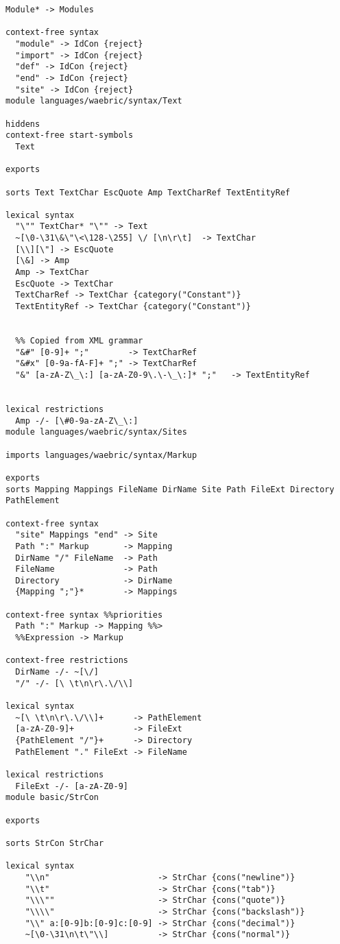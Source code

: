 \documentclass[a4paper]{article}
\begin{document}
\begin{lstlisting}[language=sdf]
  Module* -> Modules

context-free syntax
  "module" -> IdCon {reject}
  "import" -> IdCon {reject}
  "def" -> IdCon {reject}
  "end" -> IdCon {reject}
  "site" -> IdCon {reject}
module languages/waebric/syntax/Text

hiddens
context-free start-symbols
  Text

exports

sorts Text TextChar EscQuote Amp TextCharRef TextEntityRef

lexical syntax
  "\"" TextChar* "\"" -> Text 
  ~[\0-\31\&\"\<\128-\255] \/ [\n\r\t]  -> TextChar
  [\\][\"] -> EscQuote
  [\&] -> Amp
  Amp -> TextChar
  EscQuote -> TextChar
  TextCharRef -> TextChar {category("Constant")}
  TextEntityRef -> TextChar {category("Constant")}
 

  %% Copied from XML grammar
  "&#" [0-9]+ ";"        -> TextCharRef    
  "&#x" [0-9a-fA-F]+ ";" -> TextCharRef    
  "&" [a-zA-Z\_\:] [a-zA-Z0-9\.\-\_\:]* ";"   -> TextEntityRef  
  

lexical restrictions
  Amp -/- [\#0-9a-zA-Z\_\:]
module languages/waebric/syntax/Sites

imports languages/waebric/syntax/Markup

exports
sorts Mapping Mappings FileName DirName Site Path FileExt Directory PathElement

context-free syntax
  "site" Mappings "end" -> Site      
  Path ":" Markup       -> Mapping   
  DirName "/" FileName  -> Path      
  FileName              -> Path      
  Directory             -> DirName   
  {Mapping ";"}*        -> Mappings  

context-free syntax %%priorities
  Path ":" Markup -> Mapping %%>
  %%Expression -> Markup

context-free restrictions
  DirName -/- ~[\/]
  "/" -/- [\ \t\n\r\.\/\\]

lexical syntax
  ~[\ \t\n\r\.\/\\]+      -> PathElement  
  [a-zA-Z0-9]+            -> FileExt      
  {PathElement "/"}+      -> Directory    
  PathElement "." FileExt -> FileName     

lexical restrictions
  FileExt -/- [a-zA-Z0-9]
module basic/StrCon

exports

sorts StrCon StrChar

lexical syntax
    "\\n"                      -> StrChar {cons("newline")}
    "\\t"                      -> StrChar {cons("tab")}
    "\\\""                     -> StrChar {cons("quote")}
    "\\\\"                     -> StrChar {cons("backslash")}
    "\\" a:[0-9]b:[0-9]c:[0-9] -> StrChar {cons("decimal")}
    ~[\0-\31\n\t\"\\]          -> StrChar {cons("normal")}


\end{lstlisting}
\end{document}
